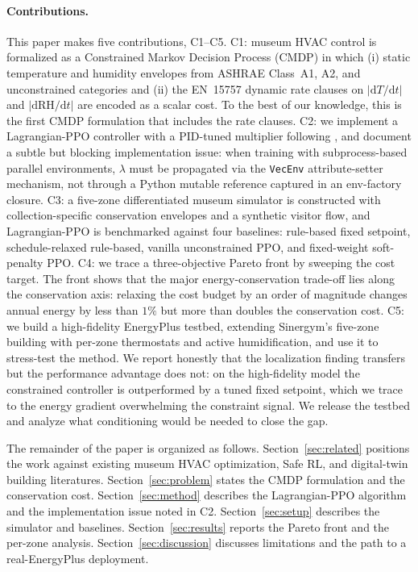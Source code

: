 \documentclass[11pt,a4paper]{article}
\begin{document}
\paragraph{Contributions.}
This paper makes five contributions, C1--C5. C1: museum HVAC control is
formalized as a Constrained
Markov Decision Process (CMDP) in which (i) static temperature and
humidity envelopes from ASHRAE Class~A1, A2, and unconstrained categories
and (ii) the EN~15757 dynamic rate clauses on
$|\mathrm{d}T/\mathrm{d}t|$ and $|\mathrm{d}\mathrm{RH}/\mathrm{d}t|$
are encoded as a scalar cost. To the best of our knowledge, this is the
first CMDP formulation that includes the rate clauses. C2: we implement
a Lagrangian-PPO controller with a PID-tuned multiplier following
\citet{stooke2020responsive}, and document a subtle but blocking
implementation issue: when training with subprocess-based parallel
environments, $\lambda$ must be propagated via the \texttt{VecEnv}
attribute-setter mechanism, not through a Python mutable reference
captured in an env-factory closure. C3: a five-zone differentiated museum
simulator is constructed with collection-specific conservation envelopes
and a synthetic visitor flow, and Lagrangian-PPO is benchmarked against
four baselines: rule-based fixed setpoint, schedule-relaxed rule-based,
vanilla unconstrained PPO, and fixed-weight soft-penalty PPO. C4: we
trace a three-objective Pareto front by sweeping the cost target. The
front shows that the major energy-conservation trade-off lies along the
conservation axis: relaxing the cost budget by an order of magnitude
changes annual energy by less than $1\%$ but more than doubles the
conservation cost. C5: we build a high-fidelity EnergyPlus testbed,
extending Sinergym's five-zone building with per-zone thermostats and
active humidification, and use it to stress-test the method. We report
honestly that the localization finding transfers but the performance
advantage does not: on the high-fidelity model the constrained
controller is outperformed by a tuned fixed setpoint, which we trace to
the energy gradient overwhelming the constraint signal. We release the
testbed and analyze what conditioning would be needed to close the gap.

The remainder of the paper is organized as follows.
Section~\ref{sec:related} positions the work against existing museum
HVAC optimization, Safe RL, and digital-twin building literatures.
Section~\ref{sec:problem} states the CMDP formulation and the
conservation cost. Section~\ref{sec:method} describes the Lagrangian-PPO
algorithm and the implementation issue noted in C2.
Section~\ref{sec:setup} describes the simulator and baselines.
Section~\ref{sec:results} reports the Pareto front and the per-zone
analysis. Section~\ref{sec:discussion} discusses limitations and the
path to a real-EnergyPlus deployment.
\end{document}
